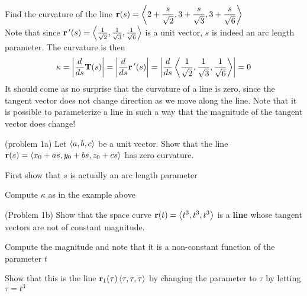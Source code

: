 \documentclass[handout]{ximera}
\begin{document}
\begin{example}[example 1]
Find the curvature of the line $\displaystyle \mathbf r(s) = \left\langle 2 + \frac{s}{\sqrt 2}, 3 + \frac{s}{\sqrt 3}, 3+ \frac{s}{\sqrt 6}\right\rangle$\\
Note that since $\mathbf r\,'(s) = \left\langle \frac{1}{\sqrt 2}, \frac{1}{\sqrt 3}, \frac{1}{\sqrt 6}\right\rangle$ is a unit vector, $s$ is indeed an arc length parameter.
The curvature is then
\[
\kappa = \left|\frac{d}{ds} \mathbf T(s)\right| = \left|\frac{d}{ds} \mathbf r\,'(s)\right| = \left|\frac{d}{ds}\left\langle \frac{1}{\sqrt 2}, \frac{1}{\sqrt 3}, \frac{1}{\sqrt 6}\right\rangle \right|= 0
\]
It should come as no surprise that the curvature of a line is zero, since the tangent vector does not change direction as we move along the line.
Note that it is possible to parameterize a line in such a way that the magnitude of the tangent vector does change! 
\end{example}

\begin{problem}(problem 1a)
Let $\left\langle a, b, c\right\rangle$ be a unit vector.  Show that the line $\mathbf r(s) = \left\langle x_0 + as, y_0 + bs, z_0 + cs\right\rangle$ has zero curvature.
\begin{hint}
First show that $s$ is actually an arc length parameter
\end{hint}
\begin{hint}
Compute $\kappa$ as in the example above
\end{hint}
\end{problem}

\begin{problem}(Problem 1b)
Show that the space curve $\mathbf r(t) = \left\langle t^3, t^3, t^3\right\rangle$ is a \textbf{line} whose tangent vectors are not of constant magnitude.\\
\begin{hint}
Compute the magnitude and note that it is a non-constant function of the parameter $t$
\end{hint}
\begin{hint}
Show that this is the line $\mathbf r_1(\tau) \left\langle \tau, \tau, \tau\right\rangle$ by changing the parameter to $\tau$ by letting $\tau = t^3$
\end{hint}
\end{problem}
\end{document}
